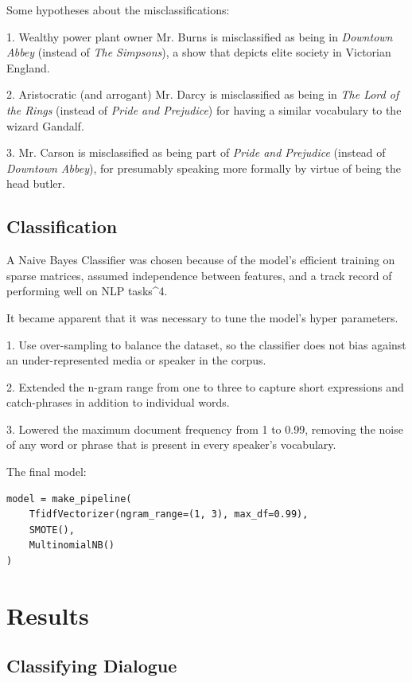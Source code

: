 \documentclass{article}
\begin{document}
\begin{titlepage}
Some hypotheses about the misclassifications:

1. Wealthy power plant owner Mr. Burns is misclassified as being in \textit{Downtown Abbey} (instead of \textit{The Simpsons}), a show that depicts elite society in Victorian England.

2. Aristocratic (and arrogant) Mr. Darcy is misclassified as being in \textit{The Lord of the Rings} (instead of \textit{Pride and Prejudice}) for having a similar vocabulary to the wizard Gandalf.

3. Mr. Carson is misclassified as being part of \textit{Pride and Prejudice} (instead of \textit{Downtown Abbey}), for presumably speaking more formally by virtue of being the head butler.

\subsection{Classification}

A Naive Bayes Classifier was chosen because of the model's efficient training on sparse matrices, assumed independence between features, and a track record of performing well on NLP tasks^4.

It became apparent that it was necessary to tune the model's hyper parameters.

1. Use over-sampling to balance the dataset, so the classifier does not bias against an under-represented media or speaker in the corpus.

2. Extended the n-gram range from one to three to capture short expressions and catch-phrases in addition to individual words.

3. Lowered the maximum document frequency from 1 to 0.99, removing the noise of any word or phrase that is present in every speaker's vocabulary.

The final model:

\begin{verbatim}
model = make_pipeline(
    TfidfVectorizer(ngram_range=(1, 3), max_df=0.99),
    SMOTE(),
    MultinomialNB()
)
\end{verbatim}

\section{Results}

\subsection{Classifying Dialogue}

\end{titlepage}
\end{document}
